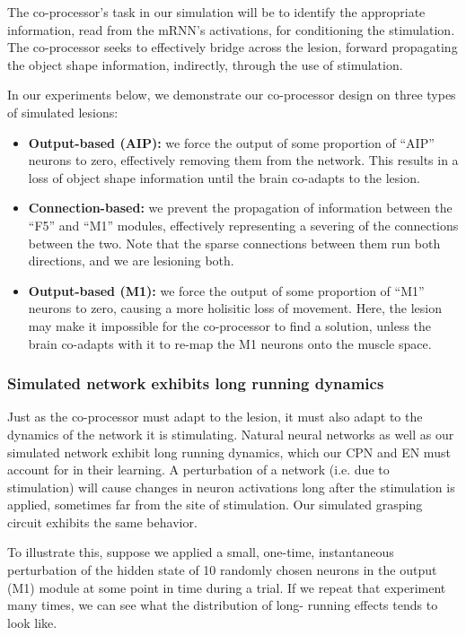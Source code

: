 \documentclass[12pt]{iopart}
\begin{document}
The co-processor's task in our simulation will be to identify the appropriate information,
read from the mRNN's activations, for conditioning the stimulation. The co-processor seeks
to effectively bridge across the lesion, forward propagating the object shape information,
indirectly, through the use of stimulation.

In our experiments below, we demonstrate our co-processor design on three types of
simulated lesions:
\begin{itemize}
	\item \textbf{Output-based (AIP):} we force the output of some proportion of ``AIP''
	      neurons to zero, effectively removing them from the network. This results in a
	      loss of object shape information until the brain co-adapts to the lesion.
	\item \textbf{Connection-based:} we prevent the propagation of
	      information between the ``F5'' and ``M1'' modules, effectively representing a
	      severing of the connections between the two. Note that the sparse connections
	      between them run both directions, and we are lesioning both.
	\item \textbf{Output-based (M1):} we force the output of some proportion of ``M1''
	      neurons to zero, causing a more holisitic loss of movement. Here, the lesion
	      may make it impossible for the co-processor to find a solution, unless the
	      brain co-adapts with it to re-map the M1 neurons onto the muscle space.
\end{itemize}

\subsubsection{Simulated network exhibits long running dynamics}
Just as the co-processor must adapt to the lesion, it must also adapt to the dynamics of
the network it is stimulating. Natural neural networks as well as our simulated network
exhibit long running dynamics, which our CPN and EN must account for in their learning.
A perturbation of a network (i.e. due to stimulation) will cause changes in neuron
activations long after the stimulation is applied, sometimes far from the site of
stimulation. Our simulated grasping circuit exhibits the same behavior.

To illustrate this, suppose we applied a small, one-time, instantaneous perturbation
of the hidden state of 10 randomly chosen neurons in the output (M1) module at some point
in time during a trial. If we repeat that experiment many times, we can see what the
distribution of long- running effects tends to look like.
\end{document}
